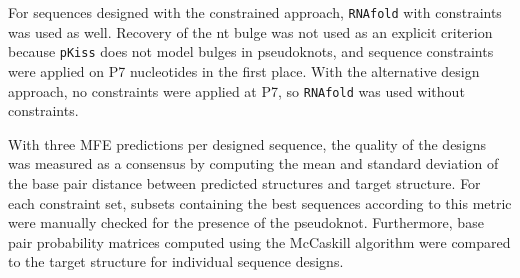\documentclass[../../master.tex]{subfiles}
\begin{document}
For sequences designed with the constrained approach, \texttt{RNAfold} with constraints was used as well.
Recovery of the \unit[1]{nt} bulge was not used as an explicit criterion because \texttt{pKiss} does not model bulges in pseudoknots, and sequence constraints were applied on P7 nucleotides in the first place.
With the alternative design approach, no constraints were applied at P7, so \texttt{RNAfold} was used without constraints.

With three MFE predictions per designed sequence, the quality of the designs was measured as a consensus by computing the mean and standard deviation of the base pair distance between predicted structures and target structure.
For each constraint set, subsets containing the best sequences according to this metric were manually checked for the presence of the pseudoknot.
Furthermore, base pair probability matrices computed using the McCaskill algorithm were compared to the target structure for individual sequence designs. 
\end{document}

